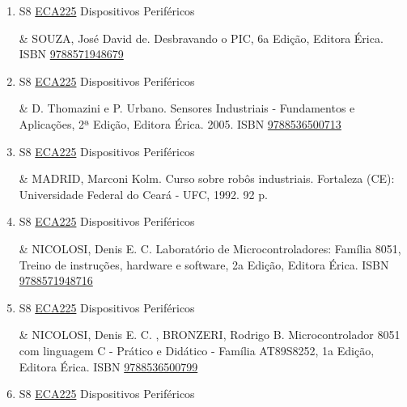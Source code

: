 \documentclass[12pt,a4paper]{book}
\begin{document}
\begin{enumerate}
&  IRWIN, J.  David.  Electrical Machines and Power Electronics.  Editora Taylor \& Francis USA.  2011.  350p.  ISBN \href{http://www.google.com/search?hl=pt-BR&tbo=p&tbm=bks&q=isbn:: 97814398028&num=10}{: 97814398028}54.
 \item S8 \hyperref[PUD:ECA225]{ECA225} Dispositivos Periféricos

&  SOUZA, José David de.  Desbravando o PIC, 6a Edição, Editora Érica.  ISBN \href{http://www.bn.br/site/pages/servicosProfissionais/agenciaISBN/isbnBusca/FbnBuscaISBNCatalogo.asp?pField=ISBN&pIntPagina=1&pISBN=71948679&nidbISBN=true&hidbISBN=true}{9788571948679}
 

 \item S8 \hyperref[PUD:ECA225]{ECA225} Dispositivos Periféricos

& D.  Thomazini e P.  Urbano.  Sensores Industriais - Fundamentos e Aplicações, 2ª Edição, Editora Érica.  2005.  ISBN \href{http://www.bn.br/site/pages/servicosProfissionais/agenciaISBN/isbnBusca/FbnBuscaISBNCatalogo.asp?pField=ISBN&pIntPagina=1&pISBN=36500713&nidbISBN=true&hidbISBN=true}{9788536500713}
 

 \item S8 \hyperref[PUD:ECA225]{ECA225} Dispositivos Periféricos

&  MADRID, Marconi Kolm.  Curso sobre robôs industriais.  Fortaleza (CE): Universidade Federal do Ceará - UFC, 1992.  92 p.
 \item S8 \hyperref[PUD:ECA225]{ECA225} Dispositivos Periféricos

&  NICOLOSI, Denis E.  C.  Laboratório de Microcontroladores: Família 8051, Treino de instruções, hardware e software, 2a Edição, Editora Érica.  ISBN \href{http://www.bn.br/site/pages/servicosProfissionais/agenciaISBN/isbnBusca/FbnBuscaISBNCatalogo.asp?pField=ISBN&pIntPagina=1&pISBN=71948716&nidbISBN=true&hidbISBN=true}{9788571948716}
 

 \item S8 \hyperref[PUD:ECA225]{ECA225} Dispositivos Periféricos

&  NICOLOSI, Denis E.  C. , BRONZERI, Rodrigo B.  Microcontrolador 8051 com linguagem C - Prático e Didático - Família AT89S8252, 1a Edição, Editora Érica.  ISBN \href{http://www.bn.br/site/pages/servicosProfissionais/agenciaISBN/isbnBusca/FbnBuscaISBNCatalogo.asp?pField=ISBN&pIntPagina=1&pISBN=36500799&nidbISBN=true&hidbISBN=true}{9788536500799}
 

 \item S8 \hyperref[PUD:ECA225]{ECA225} Dispositivos Periféricos


\end{enumerate}
\end{document}

